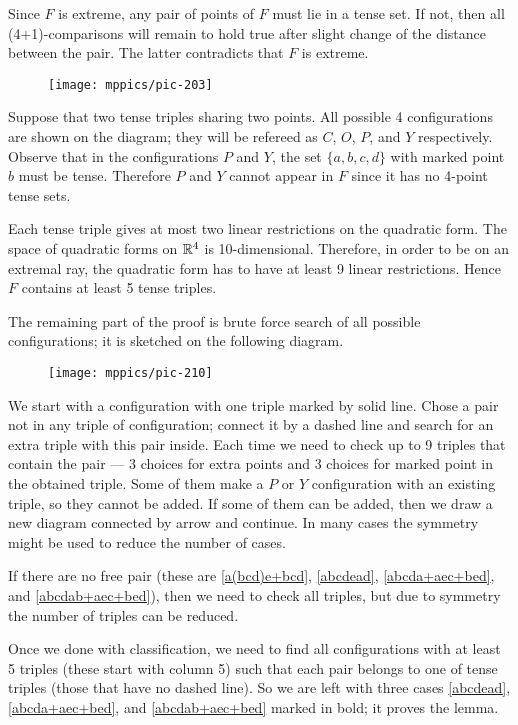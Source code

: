 \documentclass{article}
\begin{document}
Since $F$ is extreme, any pair of points of $F$ must lie in a tense set.
If not, then all (4+1)-comparisons will remain to hold true after slight change of the distance between the pair.
The latter contradicts that $F$ is extreme.

\begin{wrapfigure}{l}{60mm}
\vskip-0mm
\centering
\texttt{[image: mppics/pic-203]}
\end{wrapfigure}

Suppose that two tense triples sharing two points.
All possible 4 configurations are shown on the diagram; they will be refereed as $C$, $O$, $P$, and $Y$ respectively.
Observe that in the configurations $P$ and $Y$, the set $\{a,b,c,d\}$ with marked point $b$ must be tense.
Therefore $P$ and $Y$ cannot appear in $F$ since it has no 4-point tense sets.

Each tense triple gives at most two linear restrictions on the quadratic form.
The space of quadratic forms on $\mathbb{R}^4$ is 10-dimensional.
Therefore, in order to be on an extremal ray, the quadratic form has to have at least 9 linear restrictions.
Hence $F$ contains at least 5 tense triples.

The remaining part of the proof is brute force search of all possible configurations;
it is sketched on the following diagram.
\begin{figure}[ht!]
\centering
\texttt{[image: mppics/pic-210]}
\end{figure}

We start with a configuration with one triple marked by solid line.
Chose a pair not in any triple of configuration;
connect it by a dashed line and search for an extra triple with this pair inside.
Each time we need to check up to 9 triples that contain the pair --- 3 choices for extra points and 3 choices for marked point in the obtained triple.
Some of them make a $P$ or $Y$ configuration with an existing triple, so they cannot be added.
If some of them can be added, then we draw a new diagram connected by arrow and continue.
In many cases the symmetry might be used to reduce the number of cases.
 

If there are no free pair (these are \ref{a(bcd)e+bcd}, \ref{abcdead}, \ref{abcda+aec+bed}, and \ref{abcdab+aec+bed}),
then we need to check all triples,
but due to symmetry the number of triples can be reduced.

Once we done with classification, we need to find all configurations with at least 5 triples (these start with column 5)
such that each pair belongs to one of tense triples (those that have no dashed line).
So we are left with three cases \ref{abcdead}, \ref{abcda+aec+bed}, and \ref{abcdab+aec+bed} marked in bold;
it proves the lemma.
\end{document}
